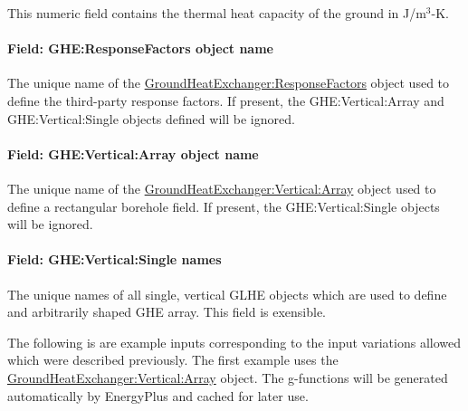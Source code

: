 This numeric field contains the thermal heat capacity of the ground in J/m\(^{3}\)-K.

\paragraph{Field: GHE:ResponseFactors object name}

The unique name of the \hyperref[groundheatexchangerresponsefactors]{GroundHeatExchanger:ResponseFactors} object used to define the third-party response factors. If present, the GHE:Vertical:Array and GHE:Vertical:Single objects defined will be ignored.

\paragraph{Field: GHE:Vertical:Array object name}

The unique name of the \hyperref[groundheatexchangerverticalarray]{GroundHeatExchanger:Vertical:Array} object used to define a rectangular borehole field. If present, the GHE:Vertical:Single objects will be ignored.

\paragraph{Field: GHE:Vertical:Single names}

The unique names of all single, vertical GLHE objects which are used to define and arbitrarily shaped GHE array. This field is exensible.

The following is are example inputs corresponding to the input variations allowed which were described previously. The first example uses the \hyperref[groundheatexchangerverticalarray]{GroundHeatExchanger:Vertical:Array} object. The g-functions will be generated automatically by EnergyPlus and cached for later use.


